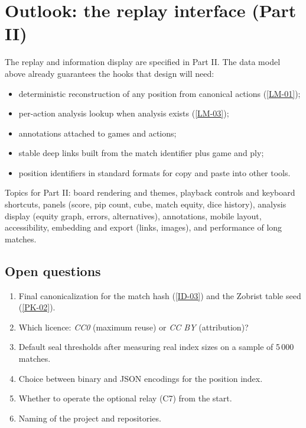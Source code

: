 \documentclass[11pt,a4paper]{article}
\newcommand{\kw}[1]{\textit{#1}\index{#1}}
\newcommand{\rref}[1]{\hyperlink{#1}{[#1]}}
\begin{document}
\section{Outlook: the replay interface (Part II)}\label{sec:replay}
The replay and information display are specified in Part II. The data model above already guarantees the hooks that design will need:
\begin{itemize}
  \item deterministic reconstruction of any position from canonical actions (\rref{LM-01});
  \item per-action analysis lookup when analysis exists (\rref{LM-03});
  \item annotations attached to games and actions;
  \item stable deep links built from the match identifier plus game and ply;
  \item position identifiers in standard formats for copy and paste into other tools.
\end{itemize}
Topics for Part II: board rendering and themes, playback controls and keyboard shortcuts, panels (score, pip count, cube, match equity, dice history), analysis display (equity graph, errors, alternatives), annotations, mobile layout, accessibility, embedding and export (links, images), and performance of long matches.

\subsection*{Open questions}
\begin{enumerate}[label=Q\arabic*.]
  \item Final canonicalization for the match hash (\rref{ID-03}) and the Zobrist table seed (\rref{PK-02}).
  \item Which licence: \kw{CC0} (maximum reuse) or \kw{CC BY} (attribution)?
  \item Default seal thresholds after measuring real index sizes on a sample of 5\,000 matches.
  \item Choice between binary and JSON encodings for the position index.
  \item Whether to operate the optional relay (C7) from the start.
  \item Naming of the project and repositories.
\end{enumerate}

\appendix
\end{document}
